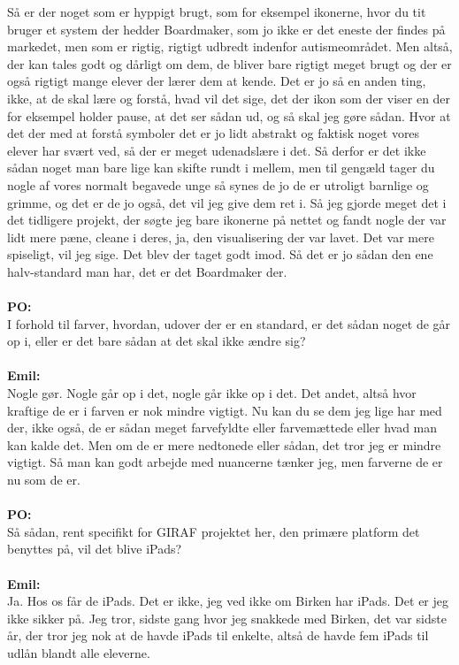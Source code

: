 Så er der noget som er hyppigt brugt, som for eksempel ikonerne, hvor du tit bruger et system der hedder Boardmaker, som jo ikke er det eneste der findes på markedet, men som er rigtig, rigtigt udbredt indenfor autismeområdet.
Men altså, der kan tales godt og dårligt om dem, de bliver bare rigtigt meget brugt og der er også rigtigt mange elever der lærer dem at kende.
Det er jo så en anden ting, ikke, at de skal lære og forstå, hvad vil det sige, det der ikon som der viser en der for eksempel holder pause, at det ser sådan ud, og så skal jeg gøre sådan.
Hvor at det der med at forstå symboler det er jo lidt abstrakt og faktisk noget vores elever har svært ved, så der er meget udenadslære i det.
Så derfor er det ikke sådan noget man bare lige kan skifte rundt i mellem, men til gengæld tager du nogle af vores normalt begavede unge så synes de jo de er utroligt barnlige og grimme, og det er de jo også, det vil jeg give dem ret i.
Så jeg gjorde meget det i det tidligere projekt, der søgte jeg bare ikonerne på nettet og fandt nogle der var lidt mere pæne, cleane i deres, ja, den visualisering der var lavet. 
Det var mere spiseligt, vil jeg sige.
Det blev der taget godt imod. 
Så det er jo sådan den ene halv-standard man har, det er det Boardmaker der. 
\\\\
\textbf{PO:}\\
I forhold til farver, hvordan, udover der er en standard, er det sådan noget de går op i, eller er det bare sådan at det skal ikke ændre sig?
\\\\
\textbf{Emil:}\\
Nogle gør.
Nogle går op i det, nogle går ikke op i det.
Det andet, altså hvor kraftige de er i farven er nok mindre vigtigt.
Nu kan du se dem jeg lige har med der, ikke også, de er sådan meget farvefyldte eller farvemættede eller hvad man kan kalde det.
Men om de er mere nedtonede eller sådan, det tror jeg er mindre vigtigt.  
Så man kan godt arbejde med nuancerne tænker jeg, men farverne de er nu som de er.
\\\\
\textbf{PO:}\\
Så sådan, rent specifikt for GIRAF projektet her, den primære platform det benyttes på, vil det blive iPads?
\\\\
\textbf{Emil:}\\
Ja.
Hos os får de iPads. 
Det er ikke, jeg ved ikke om Birken har iPads.
Det er jeg ikke sikker på.
Jeg tror, sidste gang hvor jeg snakkede med Birken, det var sidste år, der tror jeg nok at de havde iPads til enkelte, altså de havde fem iPads til udlån blandt alle eleverne.
